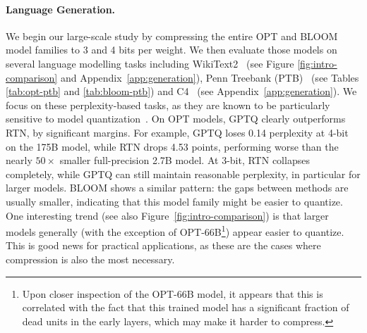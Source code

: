 \paragraph{Language Generation.} 
We begin our large-scale study by compressing the entire OPT and BLOOM model families to 3 and 4 bits per weight. 
We then evaluate those models on several language modelling tasks including WikiText2~\cite{wikitext103} (see Figure \ref{fig:intro-comparison} and Appendix~\ref{app:generation}), Penn Treebank (PTB)~\cite{PTB} (see Tables \ref{tab:opt-ptb} and \ref{tab:bloom-ptb}) and C4~\cite{C4} (see Appendix~\ref{app:generation}). 
We focus on these perplexity-based tasks, as they are known to be particularly sensitive to model quantization~\cite{yao2022zeroquant}. 
On OPT models, GPTQ clearly outperforms RTN, by significant margins. 
For example, GPTQ loses 0.14 perplexity at 4-bit on the 175B model, while RTN drops 4.53 points, performing worse than the nearly $50\times$ smaller full-precision 2.7B model. 
At 3-bit, RTN collapses completely, while GPTQ can still maintain reasonable perplexity, in particular for larger models. 
BLOOM shows a similar pattern: the gaps between methods are usually smaller, indicating that this model family might be easier to quantize. 
One interesting trend (see also Figure~\ref{fig:intro-comparison}) is that larger models generally (with the exception of OPT-66B\footnote{Upon closer inspection of the OPT-66B model, it appears that this is correlated with the fact that this trained model has a significant fraction of dead units in the early layers, which may make it harder to compress.}) appear easier to quantize. 
This is good news for practical applications, as these are the cases where compression is also the most necessary.

\begin{table}[h]
    \centering
    \vspace{5pt}
    \caption{OPT model family perplexity results on Penn Treebank.}
    \label{tab:opt-ptb}
\end{table}

